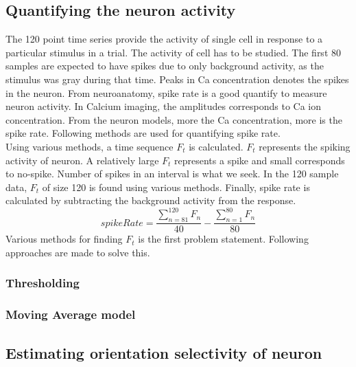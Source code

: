 \documentclass[11pt]{article}
\begin{document}
\subsection{Quantifying the neuron activity} %
\label{sub:quantifying_the_neuron_activity}
The 120 point time series provide the activity of single cell in response to a particular stimulus in a trial. The activity of cell has to be studied. The first 80 samples are expected to have spikes due to only background activity, as the stimulus was gray during that time. Peaks in Ca concentration denotes the spikes in the neuron. From neuroanatomy, spike rate is a good quantify to measure neuron activity. In Calcium imaging, the amplitudes corresponds to Ca ion concentration. From the neuron models, more the Ca concentration, more is the spike rate. Following methods are used for quantifying spike rate.\\
Using various methods, a time sequence $F_t$ is calculated. $F_t$ represents the spiking activity of neuron. A relatively large $F_t$ represents a spike and small corresponds to no-spike. Number of spikes in an interval is what we seek. In the 120 sample data, $F_t$ of size 120 is found using various methods. Finally, spike rate is calculated by subtracting the background activity from the response.
$$spikeRate = \frac{\sum_{n=81}^{120} F_n}{40} - \frac{\sum_{n=1}^{80} F_n}{80}$$
Various methods for finding $F_t$ is the first problem statement. Following approaches are made to solve this.
\subsubsection{Thresholding } %
\label{ssub:thresholding}



\subsubsection{Moving Average model} %
\label{ssub:moving_average_model}



\subsection{Estimating orientation selectivity of neuron} %
\label{sub:estimating_orientation_selectivity_of_neuron}
\end{document}
